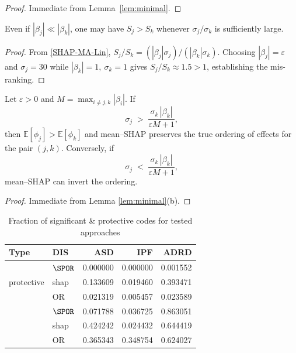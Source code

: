 \documentclass[lineno]{biometrika}
\begin{document}
\begin{proof}
Immediate from Lemma~\ref{lem:minimal}.
\end{proof}

\begin{corollary}
Even if $|\beta_j|\ll|\beta_k|$, one may have $S_j>S_k$ whenever
$\sigma_j/\sigma_k$ is sufficiently large.  
\end{corollary}

\begin{proof}
From \eqref{SHAP-MA-Lin}, $S_j/S_k=(|\beta_j|\sigma_j)/(|\beta_k|\sigma_k)$.  
Choosing $|\beta_j|=\varepsilon$ and $\sigma_j=30$ while $|\beta_k|=1,\ \sigma_k=1$
gives $S_j/S_k\approx1.5>1$, establishing the mis-ranking.
\end{proof}

\begin{corollary}\label{corshap2}
\label{cor:SHAPinflate}
Let $\varepsilon>0$ and $M=\max_{i\neq j,k}|\beta_i|$.  
If 
\[
\sigma_j \;>\; \frac{\sigma_k\,|\beta_k|}{\varepsilon M + 1},
\]
then $\mathbb{E}[\phi_j]>\mathbb{E}[\phi_k]$ and mean--SHAP preserves the true ordering of effects for the pair $(j,k)$.  
Conversely, if
\[
\sigma_j \;<\; \frac{\sigma_k\,|\beta_k|}{\varepsilon M + 1},
\]
mean--SHAP can invert the ordering.
\end{corollary}

\begin{proof}
Immediate from Lemma \ref{lem:minimal}(b).
\end{proof}


\begin{table}[t]
\centering
\caption{Fraction of significant \& protective codes for tested  approaches}\label{tabfrac}
\begin{tabular}{llrrr}
\toprule
Type & DIS & ASD & IPF & ADRD \\\hline
\midrule
\multirow{3}{*}{protective} 
  &  $\SPOR$ & 0.000000 & 0.000000 & 0.001552 \\
  & shap    & 0.133609 & 0.019460 & 0.393471 \\
  & OR      & 0.021319 & 0.005457 & 0.023589 \\
\addlinespace
\multirow{3}{*}{significant} 
  & $\SPOR$ & 0.071788 & 0.036725 & 0.863051 \\
  & shap    & 0.424242 & 0.024432 & 0.644419 \\
  & OR      & 0.365343 & 0.348754 & 0.624027 \\
\bottomrule
\end{tabular}
\end{table}
\end{document}
